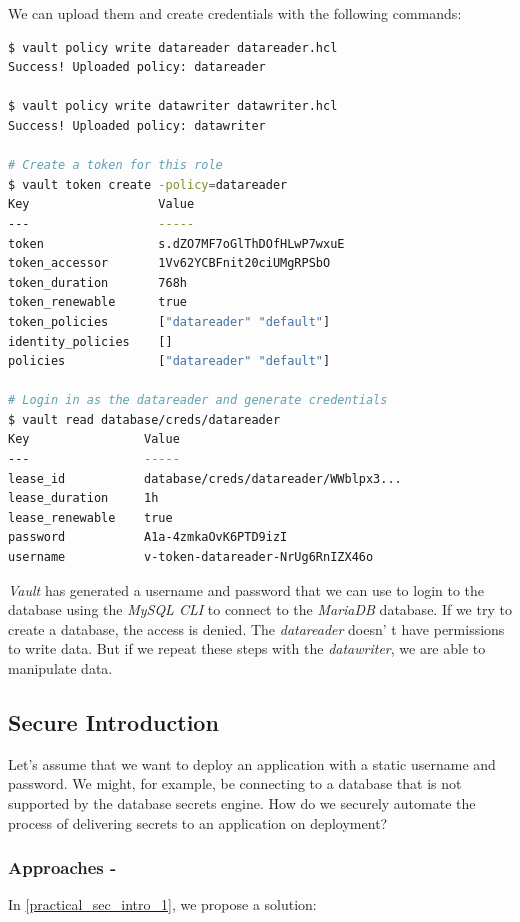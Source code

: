 \documentclass[runningheads]{llncs}
\begin{document}
We can upload them and create credentials with the following commands:

\begin{lstlisting}[language=bash]
$ vault policy write datareader datareader.hcl
Success! Uploaded policy: datareader

$ vault policy write datawriter datawriter.hcl
Success! Uploaded policy: datawriter

# Create a token for this role
$ vault token create -policy=datareader
Key                  Value
---                  -----
token                s.dZO7MF7oGlThDOfHLwP7wxuE
token_accessor       1Vv62YCBFnit20ciUMgRPSbO
token_duration       768h
token_renewable      true
token_policies       ["datareader" "default"]
identity_policies    []
policies             ["datareader" "default"]

# Login in as the datareader and generate credentials
$ vault read database/creds/datareader
Key                Value
---                -----
lease_id           database/creds/datareader/WWblpx3...
lease_duration     1h
lease_renewable    true
password           A1a-4zmkaOvK6PTD9izI
username           v-token-datareader-NrUg6RnIZX46o
\end{lstlisting}

\textit{Vault} has generated a username and password that we can use to login to the database using the \textit{MySQL CLI} to connect to the \textit{MariaDB} database. If we try to create a database, the access is denied. The \textit{datareader} doesn' t have permissions to write data. But if we repeat these steps with the \textit{datawriter}, we are able to manipulate data. 

\subsection{Secure Introduction}
\label{sec:sec_intro}

Let's assume that we want to deploy an application with a static username and password. We might, for example, be connecting to a database that is not supported by the database secrets engine. How do we securely automate the process of delivering secrets to an application on deployment? 

\subsubsection{Approaches -}In \autoref{practical_sec_intro_1}, we propose a solution: 
\end{document}
